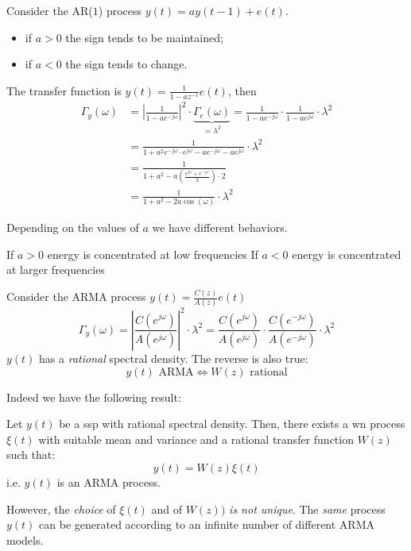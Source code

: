 \begin{example}
Consider the AR($1$) process $y(t)=ay(t-1)+e(t)$.
\begin{itemize}
	\item if $a>0$ the sign tends to be maintained;
	\item if $a<0$ the sign tends to change.
\end{itemize}
The transfer function is $y(t)=\frac{1}{1-az^{-1} }e(t)$, then
\begin{align*}
	\Gamma _{y}(\omega )&=\left|\frac{1}{1-ae^{-j\omega } }\right|^2 \cdot\underbrace{\Gamma _{e}(\omega )}_{=\lambda^2 } = \frac{1}{1-ae^{-j\omega}}\cdot\frac{1}{1-ae^{j\omega}} \cdot\lambda^2\\
	&=\frac{1}{1+a^2 e^{-j\omega }\cdot e^{j\omega }-ae^{-j\omega}-ae^{j\omega}} \cdot \lambda^2\\
	&=\frac{1}{1+a^2 -a\left( \frac{e^{j\omega}+e^{-j\omega}}{2} \right)\cdot 2}\\
	&=\frac{1}{1+a^2-2a\cos (\omega)} \cdot\lambda^2
\end{align*}
\end{example}
Depending on the values of $a$ we have different behaviors.

If $a>0$ energy is concentrated at low frequencies
If $a<0$ energy is concentrated at larger frequencies

\begin{example}
Consider the ARMA process $y(t)=\frac{C(z)}{A(z)}e(t)$
\[
	\Gamma _{y}(\omega )=\left|\frac{C(e^{j\omega})}{A(e^{j\omega})}\right|^2 \cdot\lambda^2 =\frac{C(e^{j\omega})}{A(e^{j\omega} )} \cdot \frac{C(e^{-j\omega})}{A(e^{-j\omega} )}\cdot\lambda^2 
\]
$y(t)$ has a \emph{rational} spectral density. The reverse is also true:
\[
	y(t) \text{ ARMA} \iff W(z) \text{ rational}
\]
\end{example}
Indeed we have the following result:
\begin{theorem}
	Let $y(t)$ be a \gls{ssp} with rational spectral density.
	Then, there exists a \gls{wn} process $\xi(t)$ with suitable mean and variance and a rational transfer function $W(z)$ such that:
	\[
		y(t)=W(z)\xi(t)
	\]
	i.e. $y(t)$ is an ARMA process.
\end{theorem}

However, the \emph{choice} of $\xi(t)$ and of $W(z))$ \emph{is not unique}.
The \emph{same} process $y(t)$ can be generated according to an infinite number of different ARMA models.

